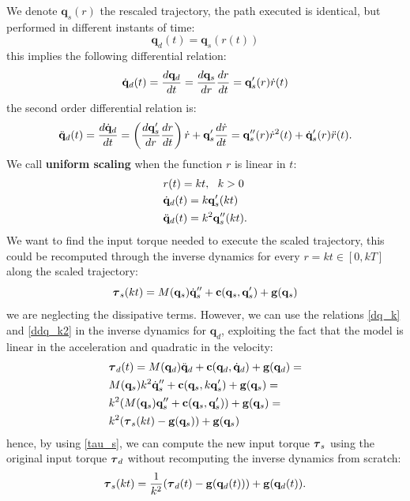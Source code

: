 \documentclass[10pt, a4paper]{report}
\newcommand{\q}{{\mathbf q}}
\begin{document}
We denote $\q_s(r)$ the rescaled trajectory, the path executed is identical, but performed in different instants of time:\begin{equation}
    \q_d(t)=\q_s(r(t))
\end{equation}
this implies the following differential relation:\begin{eqnarray}
    \dq_d(t)=\frac{d\q_d}{dt}=\frac{d \q_s}{dr}\frac{dr}{dt}=\q_s'(r)\dot r(t)
\end{eqnarray}
the second order differential relation is:\begin{equation}
    \ddq_d(t)=\frac{d\dq_d}{dt}=\left(
        \frac{d \q'_s}{dr}\frac{dr}{dt}
    \right)\dot r +\q_s'\frac{d\dot r}{dt}=\q_s''(r)\dot r^2(t)+\dq_s'(r)\ddot r(t).
\end{equation}
We call \textbf{uniform scaling} when the function $r$ is linear in $t$:\begin{align}
    &r(t)=kt, \ \ k>0\\ 
    &\dq_d(t)=k\q_s'(kt)\label{dq_k}\\ 
    &\ddq_d(t)=k^2\q_s''(kt).\label{ddq_k2}
\end{align}
We want to find the input torque needed to execute the scaled trajectory, this could be recomputed through the inverse dynamics for every $r=kt\in [0,kT]$ along the scaled trajectory:\begin{equation}
    \btau_s(kt)=M(\q_s)\dq_s''+\mathbf c(\q_s,\q_s')+\mathbf g(\q_s)
\end{equation}
we are neglecting the dissipative terms. However, we can use the relations \eqref{dq_k} and \eqref{ddq_k2} in the inverse dynamics for $\q_d$, exploiting the fact that the model is linear in the acceleration and quadratic in the velocity:\begin{align}
    &\btau_d(t)=M(\q_d)\ddq_d+\mathbf c(\q_d,\dq_d)+\mathbf g(\q_d)=\\
    &M(\q_s)k^2\dq_s''+\mathbf c(\q_s,k\q_s')+\mathbf g(\q_s)=\\
    &k^2(M(\q_s)\q_s''+\mathbf c(\q_s,\q_s'))+\mathbf g(\q_s)=\\
    &k^2(\btau_s(kt)-\mathbf g(\q_s))+\mathbf g(\q_s)\label{tau_s}
\end{align}
hence, by using \eqref{tau_s}, we can compute the new input torque ${\boldsymbol{\tau}}_s$ using the original input torque ${\boldsymbol{\tau}}_d$ without recomputing the inverse dynamics from scratch:\begin{equation}
    \btau_s(kt)=\frac{1}{k^2}(\btau_d(t)-\mathbf g(\q_d(t)))+\mathbf g(\q_d(t)).
\end{equation}
\end{document}
